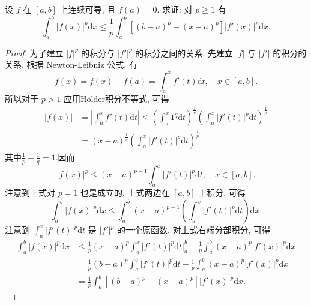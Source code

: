 \documentclass[../../main.tex]{subfiles}%
\begin{document}
\begin{example}
设 $f$ 在 $[a,b]$ 上连续可导, 且 $f(a)=0$. 求证: 对 $p\geqslant 1$ 有
$$\int_a^b|f(x)|^p\mathrm{d}x\leqslant \frac{1}{p}\int_a^b\left[(b-a)^p-(x-a)^p\right]|f'(x)|^p\mathrm{d}x.$$
\end{example}
\begin{proof}

为了建立 $|f|^p$ 的积分与 $|f'|^p$ 的积分之间的关系, 先建立 $|f|$ 与 $|f'|$ 的积分的关系. 根据 Newton-Leibniz 公式, 有
$$f(x)=f(x)-f(a)=\int_a^x f'(t)\mathrm{d}t,\quad x\in[a,b].$$
所以对于 $p>1$ 应用\hyperref[theorem:Hölder(赫尔德)不等式(积分形式)]{Hölder积分不等式}, 可得
$$
\begin{aligned}
|f(x)| &= \left|\int_a^x f'(t)\mathrm{d}t\right|\leqslant  \left(\int_a^x 1^q\mathrm{d}t\right)^{\frac{1}{q}} \left(\int_a^x |f'(t)|^p\mathrm{d}t\right)^{\frac{1}{p}} \\
&= (x-a)^{\frac{1}{q}} \left(\int_a^x |f'(t)|^p\mathrm{d}t\right)^{\frac{1}{p}}.
\end{aligned}
$$
其中$\frac{1}{p}+\frac{1}{q}=1$.因而
$$|f(x)|^p\leqslant (x-a)^{p-1}\int_a^x |f'(t)|^p\mathrm{d}t,\quad x\in[a,b].$$
注意到上式对 $p=1$ 也是成立的. 上式两边在 $[a,b]$ 上积分, 可得
$$\int_a^b|f(x)|^p\mathrm{d}x\leqslant \int_a^b(x-a)^{p-1}\left(\int_a^x |f'(t)|^p\mathrm{d}t\right)\mathrm{d}x.$$
注意到 $\int_a^x |f'(t)|^p\mathrm{d}t$ 是 $|f'|^p$ 的一个原函数. 对上式右端分部积分, 可得
$$
\begin{aligned}
\int_a^b|f(x)|^p\mathrm{d}x &\leqslant  \frac{1}{p}(x-a)^p\int_a^x |f'(t)|^p\mathrm{d}t\bigg|_a^b - \frac{1}{p}\int_a^b(x-a)^p|f'(x)|^p\mathrm{d}x \\
&= \frac{1}{p}(b-a)^p\int_a^b |f'(t)|^p\mathrm{d}t - \frac{1}{p}\int_a^b(x-a)^p|f'(x)|^p\mathrm{d}x \\
&= \frac{1}{p}\int_a^b\left[(b-a)^p-(x-a)^p\right]|f'(x)|^p\mathrm{d}x.
\end{aligned}
$$

\end{proof}
\end{document}
